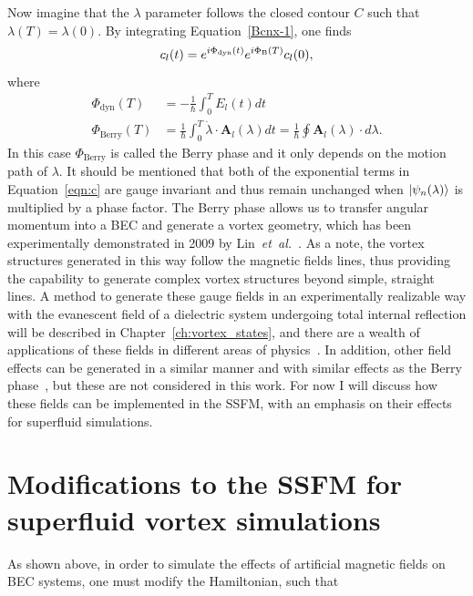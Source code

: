 Now imagine that the $\lambda$ parameter follows the closed contour $C$ such that $\lambda(T) = \lambda(0)$. 
By integrating Equation~\eqref{Bcnx-1}, one finds
\begin{equation}
c_l(t) = e^{i \Phi_{\text{dyn}}(t)}e^{i\Phi_{\text B}(T)}c_l(0),
\label{eqn:c}
\end{equation}
where
\begin{equation}
\begin{split}
\Phi_{\text{dyn}}(T) &= - \frac{1}{\hbar}\int_0^TE_l(t)dt \\
\Phi_{\text{Berry}} (T)&= \frac{1}{\hbar} \int_0 ^T \dot{\lambda} \cdot \mathbf{A}_l(\lambda)dt = \frac{1}{\hbar}\oint\mathbf{A}_l(\lambda) \cdot d\lambda.
\end{split}
\end{equation}
In this case $\Phi_{\text{Berry}}$ is called the Berry phase and it only depends on the motion path of $\lambda$. 
It should be mentioned that both of the exponential terms in Equation~\eqref{eqn:c} are gauge invariant and thus remain unchanged when $\ket{\psi_n(\lambda)}$ is multiplied by a phase factor.
The Berry phase allows us to transfer angular momentum into a BEC and generate a vortex geometry, which 
has been experimentally demonstrated in 2009 by Lin~\textit{et~al.}~\cite{lin2009}.
As a note, the vortex structures generated in this way follow the magnetic fields lines, thus providing the capability to generate complex vortex structures beyond simple, straight lines.
A method to generate these gauge fields in an experimentally realizable way with the evanescent field of a dielectric system undergoing total internal reflection will be described in Chapter~\ref{ch:vortex_states}, and there are a wealth of applications of these fields in different areas of physics~\cite{niu2017}.
In addition, other field effects can be generated in a similar manner and with similar effects as the Berry phase~\cite{wu2005}, but these are not considered in this work.
For now I will discuss how these fields can be implemented in the SSFM, with an emphasis on their effects for superfluid simulations.

\section{Modifications to the SSFM for superfluid vortex simulations}
\label{sec:implementation}

As shown above, in order to simulate the effects of artificial magnetic fields on BEC systems, one must modify the Hamiltonian, such that

